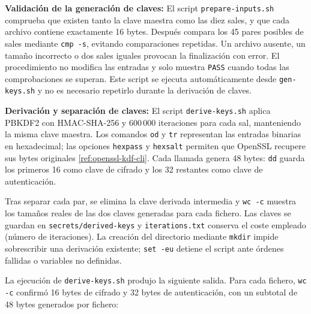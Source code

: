 \textbf{Validación de la generación de claves:} El script \texttt{prepare-inputs.sh} comprueba que existen tanto la clave maestra como las diez sales, y que cada archivo contiene exactamente 16 bytes.
Después compara los 45 pares posibles de sales mediante \texttt{cmp -s}, evitando comparaciones repetidas.
Un archivo ausente, un tamaño incorrecto o dos sales iguales provocan la finalización con error.
El procedimiento no modifica las entradas y solo muestra \texttt{PASS} cuando todas las comprobaciones se superan.
Este script se ejecuta automáticamente desde \texttt{gen-keys.sh} y no es necesario repetirlo durante la derivación de claves.

\begingroup
\renewcommand{\lstlistingname}{Script}

\endgroup

\textbf{Derivación y separación de claves:} El script \texttt{derive-keys.sh} aplica PBKDF2 con HMAC-SHA-256 y 600\,000 iteraciones para cada sal, manteniendo la misma clave maestra.
Los comandos \texttt{od} y \texttt{tr} representan las entradas binarias en hexadecimal; las opciones \texttt{hexpass} y \texttt{hexsalt} permiten que OpenSSL recupere sus bytes originales \ref{ref:openssl-kdf-cli}.
Cada llamada genera 48 bytes: \texttt{dd} guarda los primeros 16 como clave de cifrado y los 32 restantes como clave de autenticación.

Tras separar cada par, se elimina la clave derivada intermedia y \texttt{wc -c} muestra los tamaños reales de las dos claves generadas para cada fichero.
Las claves se guardan en \texttt{secrets/derived-keys} y \texttt{iterations.txt} conserva el coste empleado (número de iteraciones).
La creación del directorio mediante \texttt{mkdir} impide sobrescribir una derivación existente; \texttt{set -eu} detiene el script ante órdenes fallidas o variables no definidas.

\begingroup
\renewcommand{\lstlistingname}{Script}

\endgroup

La ejecución de \texttt{derive-keys.sh} produjo la siguiente salida.
Para cada fichero, \texttt{wc -c} confirmó 16 bytes de cifrado y 32 bytes de autenticación, con un subtotal de 48 bytes generados por fichero:

